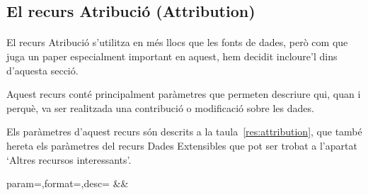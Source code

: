 \subsection{El recurs Atribució (Attribution)}

    \paragraph{}
    El recurs Atribució s'utilitza en més llocs que les fonts de dades, però com que juga un paper especialment important en aquest, hem decidit incloure'l dins d'aquesta secció.

    Aquest recurs conté principalment paràmetres que permeten descriure qui, quan i perquè, va ser realitzada una contribució o modificació sobre les dades.

    Els paràmetres d'aquest recurs són descrits a la taula~\ref{res:attribution}, que també hereta els paràmetres del recurs Dades Extensibles que pot ser trobat a l'apartat `Altres recursos interessants'.

    \begin{center}
             {param=\param,format=\format,desc=\desc}
             {\param&\format&\desc}
     \end{center}
